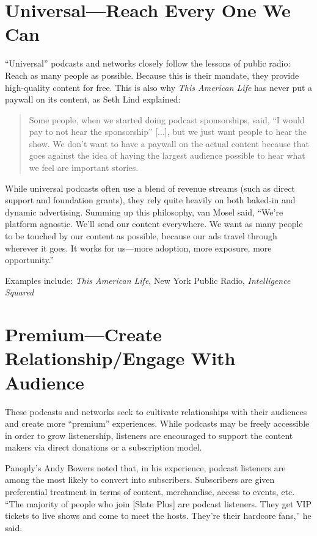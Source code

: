 \documentclass[notoc, symmetric, nobib, nols]{towcenter-guideto-book}
\begin{document}
\section{Universal---Reach Every One We Can}

``Universal'' podcasts and networks closely follow the lessons of public radio: Reach as many people as possible. Because this is their mandate, they provide high-quality content for free. This is also why \textit{This American Life} has never put a paywall on its content, as Seth Lind explained: 

\begin{quote}
Some people, when we started doing podcast sponsorships, said, ``I would pay to not hear the sponsorship'' [...], but we just want people to hear the show. We don't want to have a paywall on the actual content because that goes against the idea of having the largest audience possible to hear what we feel are important stories.\autocite{lind}
\end{quote}

While universal podcasts often use a blend of revenue streams (such as direct support and foundation grants), they rely quite heavily on both baked-in and dynamic advertising. Summing up this philosophy, van Mosel said, ``We're platform agnostic. We'll send our content everywhere. We want as many people to be touched by our content as possible, because our ads travel through wherever it goes. It works for us---more adoption, more exposure, more opportunity.''\autocite{mosel}

Examples include: \textit{This American Life}, New York Public Radio, \textit{Intelligence Squared}

\section{Premium---Create Relationship/Engage With Audience}

These podcasts and networks seek to cultivate relationships with their audiences and create more ``premium'' experiences. While podcasts may be freely accessible in order to grow listenership, listeners are encouraged to support the content makers via direct donations or a subscription model. 

Panoply's Andy Bowers noted that, in his experience, podcast listeners are among the most likely to convert into subscribers. Subscribers are given preferential treatment in terms of content, merchandise, access to events, etc. ``The majority of people who join [Slate Plus] are podcast listeners. They get VIP tickets to live shows and come to meet the hosts. They're their hardcore fans,'' he said.\autocite{bowers} 
\end{document}
